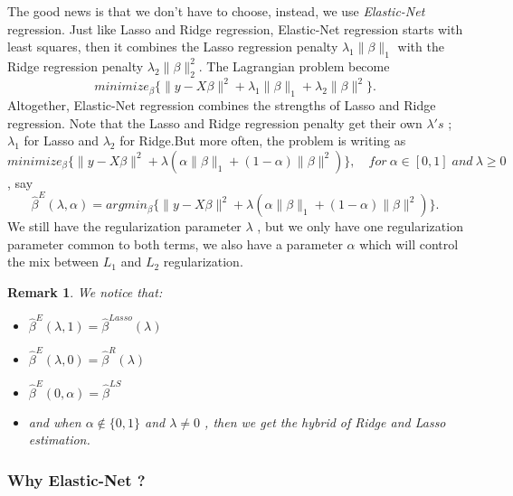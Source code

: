 \documentclass[12pt]{report}
\renewcommand{\emph}{\textit}
\newtheorem{remarque}{Remark}[section]
\begin{document}
	The good news is that we don't have to choose, instead, we use \emph{Elastic-Net} regression. Just like Lasso and Ridge regression, Elastic-Net regression starts with least squares, then it combines the Lasso regression penalty $\lambda_{1}\parallel \beta \parallel_{1}$ with the Ridge regression penalty $\lambda_{2}\parallel \beta \parallel^{2}_{2}$. The Lagrangian problem become 
	$$minimize_{\beta}\{\parallel y-X\beta \parallel^{2} +\lambda_{1}\parallel \beta \parallel_{1}+\lambda_{2}\parallel \beta \parallel^{2}\}.$$
	Altogether, Elastic-Net regression combines the strengths of Lasso and Ridge regression. Note that the Lasso and Ridge regression penalty get their own $\lambda's$ ; $\lambda_{1}$ for Lasso and $\lambda_{2}$ for Ridge.But more often, the problem is writing as
	$$minimize_{\beta}\{\parallel y-X\beta \parallel^{2} +\lambda(\alpha \parallel \beta \parallel_{1}+(1-\alpha)\parallel \beta \parallel^{2})\},\quad for\ \alpha \in [0,1]\; and\ \lambda \geq 0$$, say
	\begin{equation}
		\hat{\beta}^{E}(\lambda,\alpha)=argmin_{\beta}\{\parallel y-X\beta \parallel^{2} +\lambda(\alpha \parallel \beta \parallel_{1}+(1-\alpha)\parallel \beta \parallel^{2})\}.
	\end{equation}
	We still have the regularization parameter $\lambda$ , but we only have one regularization parameter common to both terms, we also have a parameter $\alpha$  which will control the mix between  $L_{1}$ and $L_{2}$ regularization. 
	\begin{remarque}
		We notice that:
		\begin{itemize}
			\item $\hat{\beta}^{E}(\lambda,1)=\hat{\beta}^{Lasso}(\lambda)$
			\item $\hat{\beta}^{E}(\lambda,0)=\hat{\beta}^{R}(\lambda)$
			\item $\hat{\beta}^{E}(0,\alpha)=\hat{\beta}^{LS}$
			\item and when $\alpha \notin\{0,1\} $ and $\lambda \neq 0$ , then we get the hybrid of Ridge and Lasso estimation.
		\end{itemize}
	\end{remarque}
	
	\begin{center}
		\subsubsection{Why Elastic-Net ?}
	\end{center}
	
\end{document}
